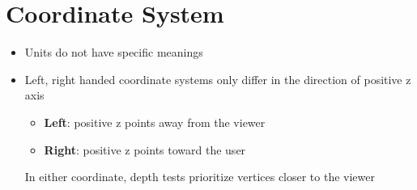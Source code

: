 \section{Coordinate System}

\begin{itemize}
  \item Units do not have specific meanings
  \item Left, right handed coordinate systems only differ in the direction of
  positive z axis
  \begin{itemize}
    \item \textbf{Left}: positive z points away from the viewer
    \item \textbf{Right}: positive z points toward the user
  \end{itemize}

  In either coordinate, depth tests prioritize vertices closer to the viewer
\end{itemize}
